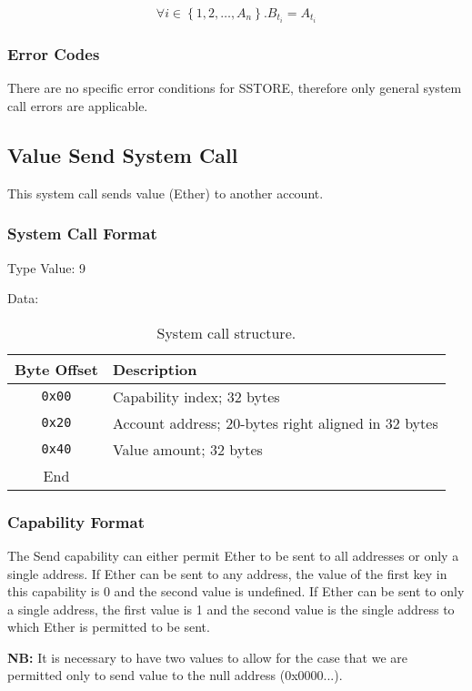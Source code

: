 \documentclass[english,a4paper]{article}
\let\oldparagraph\subsubsection
\renewcommand{\subsubsection}[1]{\oldparagraph{#1}\mbox{}}
\begin{document}
$$ \forall i \in \left\{1,2,\dots ,A_n\right\}. B_{t_i} = A_{t_i} $$

\subsubsection{Error Codes}
There are no specific error conditions for SSTORE, therefore only general system
call errors are applicable.

\subsection{Value Send System Call}
This system call sends value (Ether) to another account.

\subsubsection{System Call Format}
Type Value: 9

Data:

\begin{table}[H]
  \caption{System call structure.}
  \centering{}%
  \begin{tabularx}{\textwidth}{c|X}
    \hline
    Byte Offset & Description\\
    \hline
    \hline
    \texttt{0x00} & Capability index; 32 bytes \\
    \texttt{0x20} & Account address; 20-bytes right aligned in 32 bytes \\
    \texttt{0x40} & Value amount; 32 bytes \\
    \hline
    End &  \\
    \hline
  \end{tabularx}
\end{table}

\subsubsection{Capability Format}

The Send capability can either permit Ether to be sent to all addresses or only
a single address. If Ether can be sent to any address, the value of the first
key in this capability is 0 and the second value is undefined. If Ether can be
sent to only a single address, the first value is 1 and the second value is the
single address to which Ether is permitted to be sent.

\textbf{NB:} It is necessary to have two values to allow for the case that we
are permitted only to send value to the null address (0x0000...).
\end{document}

